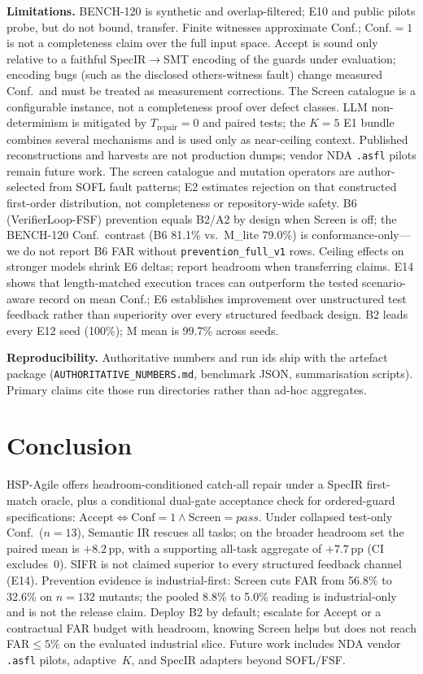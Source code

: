 \documentclass[10pt,conference]{IEEEtran}
\newcommand{\runin}[1]{\medskip\noindent\textbf{#1}\enspace}
\begin{document}
\runin{Limitations.}
BENCH-120 is synthetic and overlap-filtered; E10 and public pilots probe, but
do not bound, transfer.
Finite witnesses approximate Conf.; Conf.${=}1$ is not a completeness claim
over the full input space.
Accept is sound only relative to a faithful SpecIR$\to$SMT encoding of the
guards under evaluation; encoding bugs (such as the disclosed others-witness
fault) change measured Conf.\ and must be treated as measurement corrections.
The Screen catalogue is a configurable instance, not a completeness proof over
defect classes.
LLM non-determinism is mitigated by $T_\text{repair}{=}0$ and paired tests;
the $K{=}5$ E1 bundle combines several mechanisms and is used only as
near-ceiling context.
Published reconstructions and harvests are not production dumps; vendor NDA
\texttt{.asfl} pilots remain future work.
The screen catalogue and mutation
operators are author-selected from SOFL fault patterns; E2 estimates rejection
on that constructed first-order distribution, not completeness or
repository-wide safety.
B6 (VerifierLoop-FSF) prevention equals B2/A2 by design when Screen is off;
the BENCH-120 Conf.\ contrast (B6 81.1\% vs.\ M\_lite 79.0\%) is
conformance-only---we do not report B6 FAR without \texttt{prevention\_full\_v1}
rows.
Ceiling effects on stronger models shrink E6 deltas; report headroom when
transferring claims.
E14 shows that length-matched execution traces can outperform the tested
scenario-aware record on mean Conf.; E6 establishes improvement over
unstructured test feedback rather than superiority over every structured
feedback design.
B2 leads every E12 seed (100\%); M mean is 99.7\% across seeds.

\runin{Reproducibility.}
Authoritative numbers and run ids ship with the artefact package
(\texttt{AUTHORITATIVE\_NUMBERS.md}, benchmark JSON, summarisation scripts).
Primary claims cite those run directories rather than ad-hoc aggregates.

\section{Conclusion}
HSP-Agile offers headroom-conditioned catch-all repair under a SpecIR
first-match oracle, plus a conditional dual-gate acceptance check for
ordered-guard specifications:
$\mathrm{Accept}\Leftrightarrow\mathrm{Conf}{=}1\wedge\mathrm{Screen}{=}\mathit{pass}$.
Under collapsed test-only Conf.\ ($n{=}13$), Semantic IR rescues all tasks;
on the broader headroom set the paired mean is ${+}8.2$\,pp, with a supporting
all-task aggregate of ${+}7.7$\,pp (CI excludes~0).
SIFR is not claimed superior to every structured feedback channel (E14).
Prevention evidence is industrial-first: Screen cuts FAR from 56.8\% to
32.6\% on $n{=}132$ mutants; the pooled 8.8\% to 5.0\% reading is
industrial-only and is not the release claim.
Deploy B2 by default; escalate for Accept or a contractual FAR budget with
headroom, knowing Screen helps but does not reach FAR${\le}5\%$ on the
evaluated industrial slice.
Future work includes NDA vendor \texttt{.asfl} pilots, adaptive~$K$, and
SpecIR adapters beyond SOFL/FSF.



\balance
\end{document}
